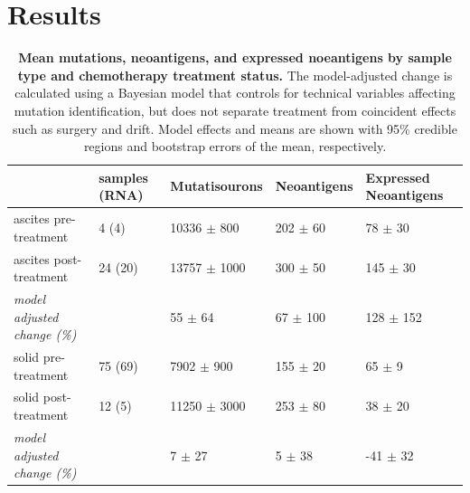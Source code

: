 \section*{Results}

\begin{table}[htbp]

\begin{tabular}{lllll}
\toprule
{} & samples (RNA) &         Mutatisourons &   Neoantigens & Expressed Neoantigens \\
\midrule
ascites pre-treatment                 &         4 (4) &   10336 $\pm$ 800 &  202 $\pm$ 60 &           78 $\pm$ 30 \\
ascites post-treatment                &       24 (20) &  13757 $\pm$ 1000 &  300 $\pm$ 50 &          145 $\pm$ 30 \\
\textit{model adjusted change (\%)} &               &       55 $\pm$ 64 &  67 $\pm$ 100 &         128 $\pm$ 152 \\
\hline
solid pre-treatment                   &       75 (69) &    7902 $\pm$ 900 &  155 $\pm$ 20 &            65 $\pm$ 9 \\
solid post-treatment                  &        12 (5) &  11250 $\pm$ 3000 &  253 $\pm$ 80 &           38 $\pm$ 20 \\
\textit{model adjusted change (\%)}   &               &        7 $\pm$ 27 &    5 $\pm$ 38 &          -41 $\pm$ 32 \\
\bottomrule
\end{tabular}

\caption{\textbf{Mean mutations, neoantigens, and expressed noeantigens by sample type and chemotherapy treatment status.} The model-adjusted change is calculated using a Bayesian model that controls for technical variables affecting mutation identification, but does not separate treatment from coincident effects such as surgery and drift. Model effects and means are shown with 95\% credible regions and bootstrap errors of the mean, respectively.}
\label{tab:cohort}
\end{table}

